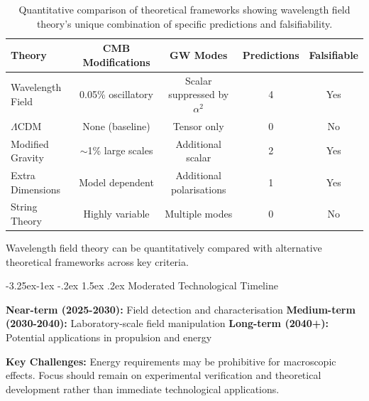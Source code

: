 \documentclass[10pt,twocolumn]{article}
\makeatletter
\renewcommand\subsection{\@startsection{subsection}{2}{\z@}%
  {-3.25ex\@plus -1ex \@minus -.2ex}%
  {1.5ex \@plus .2ex}%
  {\normalfont\normalsize\bfseries}}
\makeatother
\begin{document}
\begin{table}[h]
\centering
\begin{tabular}{|l|c|c|c|c|}
\hline
\textbf{Theory} & \textbf{CMB Modifications} & \textbf{GW Modes} & \textbf{Predictions} & \textbf{Falsifiable} \\
\hline
Wavelength Field & 0.05\% oscillatory & Scalar suppressed by $\alpha^2$ & 4 & Yes \\
$\Lambda$CDM & None (baseline) & Tensor only & 0 & No \\
Modified Gravity & $\sim$1\% large scales & Additional scalar & 2 & Yes \\
Extra Dimensions & Model dependent & Additional polarisations & 1 & Yes \\
String Theory & Highly variable & Multiple modes & 0 & No \\
\hline
\end{tabular}
\caption{Quantitative comparison of theoretical frameworks showing wavelength field theory's unique combination of specific predictions and falsifiability.}
\end{table}

Wavelength field theory can be quantitatively compared with alternative theoretical frameworks across key criteria.

\subsection{Moderated Technological Timeline}

\textbf{Near-term (2025-2030):} Field detection and characterisation
\textbf{Medium-term (2030-2040):} Laboratory-scale field manipulation  
\textbf{Long-term (2040+):} Potential applications in propulsion and energy

\textbf{Key Challenges:} Energy requirements may be prohibitive for macroscopic effects. Focus should remain on experimental verification and theoretical development rather than immediate technological applications.

\clearpage
\end{document}
